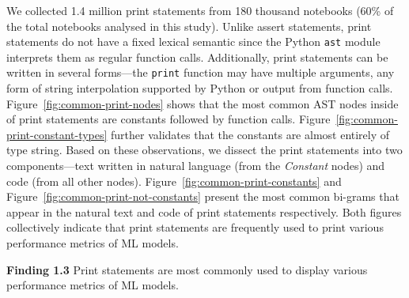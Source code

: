 \documentclass[smallextended]{svjour3}       %
\newcommand{\highlight}[1]{\begin{framed}%
  \noindent#1
\end{framed}}
\begin{document}
We collected 1.4 million print statements from 180 thousand notebooks (60\% of the total notebooks analysed in this study). Unlike assert statements, print statements do not have a fixed lexical semantic since the Python \lstinline{ast} module interprets them as regular function calls. Additionally, print statements can be written in several forms---the \lstinline{print} function may have multiple arguments, any form of string interpolation supported by Python or output from function calls. Figure~\ref{fig:common-print-nodes} shows that the most common AST nodes inside of print statements are constants followed by function calls. Figure~\ref{fig:common-print-constant-types} further validates that the constants are almost entirely of type string. Based on these observations, we dissect the print statements into two components---text written in natural language (from the \emph{Constant} nodes) and code (from all other nodes). Figure~\ref{fig:common-print-constants} and Figure~\ref{fig:common-print-not-constants} present the most common bi-grams that appear in the natural text and code of print statements respectively. Both figures collectively indicate that print statements are frequently used to print various performance metrics of ML models.

\highlight{\textbf{Finding 1.3} Print statements are most commonly used to display various performance metrics of ML models.}
\end{document}
